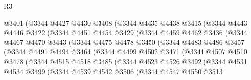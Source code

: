 \begin{lexlean}{R3}
\begin{coremodule}
                  @3401
                  (@3344
                    @4427
                    @4430
                    @3408
                    (@3344
                      @4435
                      @4438
                      @3415
                      (@3344
                        @4443
                        @4446
                        @3422
                        (@3344
                          @4451
                          @4454
                          @3429
                          (@3344
                            @4459
                            @4462
                            @3436
                            (@3344
                              @4467
                              @4470
                              @3443
                              (@3344
                                @4475
                                @4478
                                @3450
                                (@3344
                                  @4483
                                  @4486
                                  @3457
                                  (@3344
                                    @4491
                                    @4494
                                    @3464
                                    (@3344
                                      @4499
                                      @4502
                                      @3471
                                      (@3344
                                        @4507
                                        @4510
                                        @3478
                                        (@3344
                                          @4515
                                          @4518
                                          @3485
                                          (@3344
                                            @4523
                                            @4526
                                            @3492
                                            (@3344
                                              @4531
                                              @4534
                                              @3499
                                              (@3344
                                                @4539
                                                @4542
                                                @3506
                                                (@3344
                                                  @4547
                                                  @4550
                                                  @3513

\end{coremodule}
\end{lexlean}
